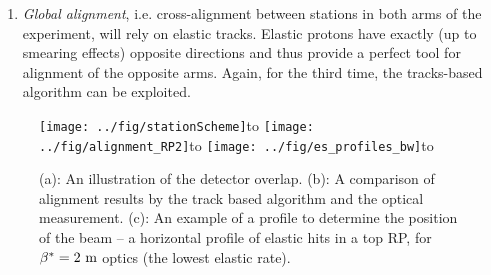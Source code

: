 \documentclass{desyproc}
\def\be{\beta}
\def\un#1{\ {\rm #1}}
\def\subtitle#1#2{\vbox{\setbox0\hbox{#1}\copy0\hbox to\wd0{\hss#2\hss}}}
\begin{document}
\begin{enumerate}
The Beam Position Monitors (one mounted on each RP unit) can monitor relative beam fluctuations with a precision of several microns. Absolute beam position measurements are, however, exposed to a large uncertainty on the offset and thus need to be cross-calibrated with results of other methods (e.g. the profile method from the previous paragraph).

Another important device is the control of RP motors, which can resolve the position of RP once it has been moved in a working place. After a careful absolute calibration a resolution of about $10\un{\mu m}$ is expected.

\item {\em Global alignment}, i.e. cross-alignment between stations in both arms of the experiment, will rely on elastic tracks. Elastic protons have exactly (up to smearing effects) opposite directions and thus provide a perfect tool for alignment of the opposite arms. Again, for the third time, the tracks-based algorithm can be exploited.
\end{enumerate}

\begin{figure}[hb]
\centerline{\hss
	\subtitle{\texttt{[image: ../fig/stationScheme]}}{(a)}\hfil
	\subtitle{\texttt{[image: ../fig/alignment\_RP2]}}{(b)}\hfil
	\subtitle{\texttt{[image: ../fig/es\_profiles\_bw]}}{(c)}\hss
}%
\vskip-1mm
\caption{(a): An illustration of the detector overlap.
(b): A comparison of alignment results by the track based algorithm and the optical measurement.
(c): An example of a profile to determine the position of the beam -- a horizontal profile of elastic hits in a top RP, for $\be^* = 2\un{m}$ optics (the lowest elastic rate).
}%
\label{fig:align}%
\end{figure}
\end{document}

